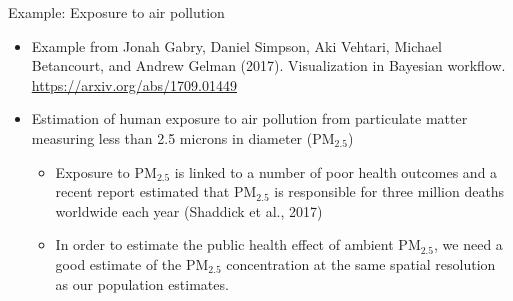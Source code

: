 \documentclass[t]{beamer}
\begin{document}
\begin{frame}

  {\Large\color{navyblue} Example: Exposure to air pollution}

  \begin{itemize}
  \item Example from Jonah Gabry, Daniel Simpson, Aki Vehtari, Michael
    Betancourt, and Andrew Gelman (2017). Visualization in Bayesian
    workflow. \url{https://arxiv.org/abs/1709.01449}
  \item Estimation of human exposure to air pollution from particulate
    matter measuring less than 2.5 microns in diameter ($\mathrm{PM}_{2.5}$)
    \begin{itemize}
    \item Exposure to $\mathrm{PM}_{2.5}$ is linked to a number of
      poor health outcomes and a recent report estimated that
      $\mathrm{PM}_{2.5}$ is responsible for three million deaths
      worldwide each year (Shaddick et al., 2017)
    \item In order to estimate the public health effect of ambient
      $\mathrm{PM}_{2.5}$, we need a good estimate of the
      $\mathrm{PM}_{2.5}$ concentration at the same spatial resolution
      as our population estimates.
    \end{itemize}
\end{itemize}

\end{frame}
\end{document}
